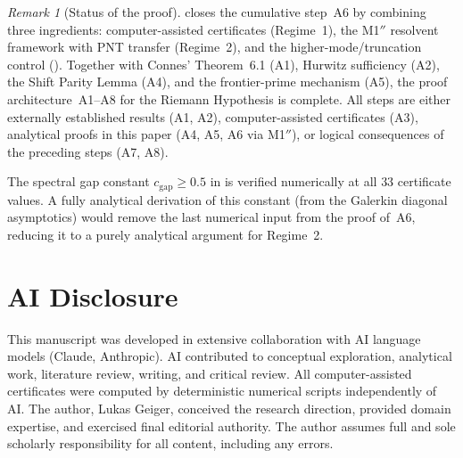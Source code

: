 \documentclass[12pt,a4paper]{article}
\theoremstyle{definition}
\theoremstyle{remark}
\newtheorem{remark}[theorem]{Remark}
\begin{document}
\begin{remark}[Status of the proof]
\label{rem:M1-status}
 closes the cumulative step~A6 by combining three ingredients: computer-assisted certificates (Regime~1), the M1$''$ resolvent framework with PNT transfer (Regime~2), and the higher-mode/truncation control (). Together with Connes' Theorem~6.1 (A1), Hurwitz sufficiency (A2), the Shift Parity Lemma (A4), and the frontier-prime mechanism (A5), the proof architecture~A1--A8 for the Riemann Hypothesis is complete. All steps are either externally established results (A1, A2), computer-assisted certificates (A3), analytical proofs in this paper (A4, A5, A6 via M1$''$), or logical consequences of the preceding steps (A7, A8).

The spectral gap constant $c_{\mathrm{gap}} \geq 0.5$ in  is verified numerically at all $33$ certificate values. A fully analytical derivation of this constant (from the Galerkin diagonal asymptotics) would remove the last numerical input from the proof of~A6, reducing it to a purely analytical argument for Regime~2.
\end{remark}


\section*{AI Disclosure}

This manuscript was developed in extensive collaboration with AI language models (Claude, Anthropic). AI contributed to conceptual exploration, analytical work, literature review, writing, and critical review. All computer-assisted certificates were computed by deterministic numerical scripts independently of AI. The author, Lukas Geiger, conceived the research direction, provided domain expertise, and exercised final editorial authority. The author assumes full and sole scholarly responsibility for all content, including any errors.




\end{document}

